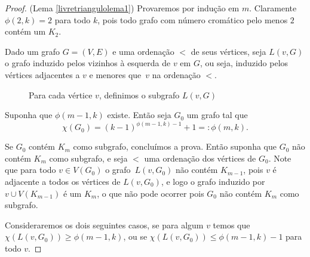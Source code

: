 \begin{proof}(Lema \ref{livretriangulolema1})
Provaremos por indução em $m$. Claramente $\phi(2,k) = 2$ para todo $k$, pois todo grafo com número cromático pelo menos $2$ contém um $K_2$.

Dado um grafo $G = (V,E)$ e uma ordenação $<$ de seus vértices, seja $L(v,G)$ o grafo induzido pelos vizinhos à esquerda de $v$ em $G$, ou seja, induzido pelos vértices adjacentes a $v$ e menores que~$v$ na ordenação $<$.

\begin{figure}[H]
\centering
{}
\caption{Para cada vértice $v$, definimos o subgrafo $L(v,G)$}
\label{fig:leftneighbor}
\end{figure}

Suponha que $\phi(m-1,k)$ existe. Então seja $G_0$ um grafo tal que \[\chi(G_0) = (k-1)^{\phi(m-1,k)-1}+1 =: \phi(m,k).\]

Se $G_0$ contém $K_m$ como subgrafo, concluímos a prova. Então suponha que $G_0$ não contém $K_m$ como subgrafo, e seja $<$ uma ordenação dos vértices de $G_0$. Note que para todo $v \in V(G_0)$ o grafo~$L(v,G_0)$ não contém $K_{m-1}$, pois $v$ é adjacente a todos os vértices de $L(v,G_0)$, e logo o grafo induzido por $v\cup V(K_{m-1})$ é um $K_{m}$, o que não pode ocorrer pois $G_0$ não contém $K_m$ como subgrafo.

Consideraremos os dois seguintes casos, se para algum $v$ temos que $\chi(L(v,G_0)) \geq \phi(m-1,k)$, ou se $\chi(L(v,G_0)) \leq \phi(m-1,k) - 1$ para todo $v$.


\end{proof}
